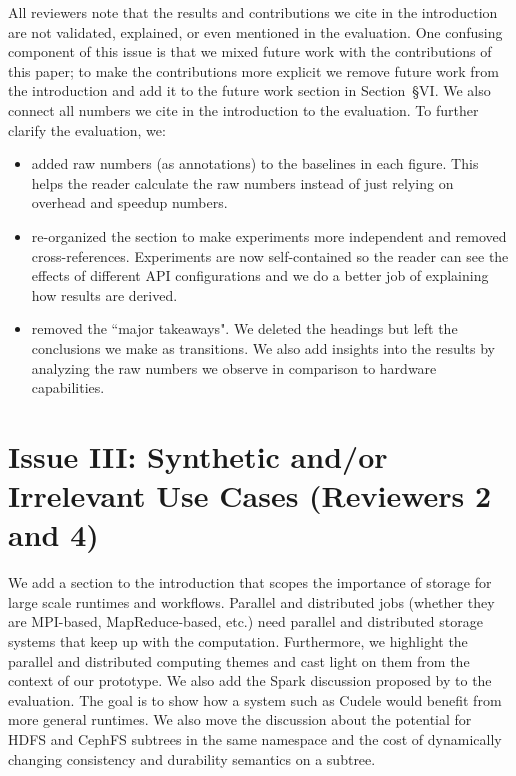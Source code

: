 \documentclass[onecolumn,conference]{IEEEtran}
\begin{document}
All reviewers note that the results and contributions we cite in the
introduction are not validated, explained, or even mentioned in the evaluation.
One confusing component of this issue is that we mixed future work with the
contributions of this paper; to make the contributions more explicit we remove
future work from the introduction and add it to the future work section in
Section~{\S}VI. We also connect all numbers we cite in the introduction to the
evaluation. To further clarify the evaluation, we:

\begin{itemize}

  \item added raw numbers (as annotations) to the baselines in each figure.
This helps the reader calculate the raw numbers instead of just relying on
overhead and speedup numbers. 

  \item re-organized the section to make experiments more independent and
removed cross-references. Experiments are now self-contained so the reader can
see the effects of different API configurations and we do a better job of
explaining how results are derived. 

  \item removed the ``major takeaways". We deleted the headings but left the
conclusions we make as transitions. We also add insights into the results by
analyzing the raw numbers we observe in comparison to hardware capabilities.

\end{itemize}

\section*{Issue III: Synthetic and/or Irrelevant Use Cases (Reviewers 2 and 4)}

We add a section to the introduction that scopes the importance of storage for
large scale runtimes and workflows. Parallel and distributed jobs (whether they
are MPI-based, MapReduce-based, etc.) need parallel and distributed storage
systems that keep up with the computation. Furthermore, we highlight the
parallel and distributed computing themes and cast light on them from the
context of our prototype. We also add the Spark discussion proposed by to the
evaluation. The goal is to show how a system such as Cudele would benefit from
more general runtimes. We also move the discussion about the potential for HDFS
and CephFS subtrees in the same namespace and the cost of dynamically changing
consistency and durability semantics on a subtree. 
\end{document}
